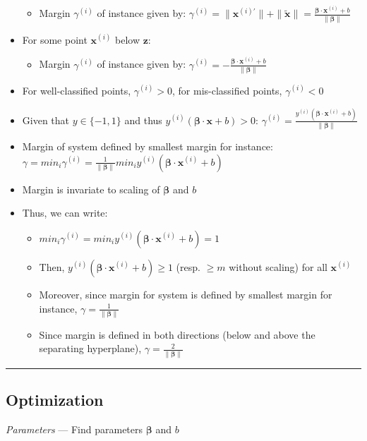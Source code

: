 \begin{itemize}
\begin{itemize}
        \item Margin $\gamma^{(i)}$ of instance given by: $\gamma^{(i)} = \| \boldsymbol{x}^{(i)'} \| + \| \tilde{\boldsymbol{x}} \| = \frac{ \boldsymbol{\beta} \cdot \boldsymbol{x}^{(i)} + b }{\| \boldsymbol{\beta} \|}$
    \end{itemize}
    \item For some point $\boldsymbol{x}^{(i)}$ below $\boldsymbol{z}$:
    \begin{itemize}
        \item Margin $\gamma^{(i)}$ of instance given by: $\gamma^{(i)} = - \frac{ \boldsymbol{\beta} \cdot \boldsymbol{x}^{(i)} + b }{\| \boldsymbol{\beta} \|}$
    \end{itemize}
    \item For well-classified points, $\gamma^{(i)} > 0$, for mis-classified points, $\gamma^{(i)} < 0$
    \item Given that $y \in \{-1,1\}$ and thus $y^{(i)} (\boldsymbol{\beta} \cdot \boldsymbol{x} + b) > 0$:
    $\gamma^{(i)} = \frac{ y^{(i)} (\boldsymbol{\beta} \cdot \boldsymbol{x}^{(i)} + b) }{\| \boldsymbol{\beta} \|}$
    \item Margin of system defined by smallest margin for instance: $\gamma = min_i \gamma^{(i)} = \frac{1}{\| \boldsymbol{\beta} \|} min_i y^{(i)} (\boldsymbol{\beta} \cdot \boldsymbol{x}^{(i)} + b)$
    \item Margin is invariate to scaling of $\boldsymbol{\beta}$ and $b$
    \item Thus, we can write:
    \begin{itemize}
        \item $min_i \gamma^{(i)} = min_i y^{(i)} (\boldsymbol{\beta} \cdot \boldsymbol{x}^{(i)} + b) = 1$
        \item Then, $y^{(i)} (\boldsymbol{\beta} \cdot \boldsymbol{x}^{(i)} + b) \geq 1$ (resp. $\geq m$ without scaling) for all $\boldsymbol{x}^{(i)}$
        \item Moreover, since margin for system is defined by smallest margin for instance, $\gamma = \frac{1}{\| \boldsymbol{\beta} \|} $
        \item Since margin is defined in both directions (below and above the separating hyperplane), $\gamma = \frac{2}{\| \boldsymbol{\beta} \|} $
    \end{itemize}
\end{itemize}

{\color{black}\hrule height 0.001mm}

\subsection*{Optimization}
\emph{Parameters} --- Find parameters $\boldsymbol{\beta}$ and $b$

